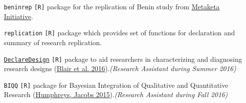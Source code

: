 
\begin{cvskills}

\cvskill
    {\texttt{beninrep}} %
    {\texttt{[R]} package for the replication of Benin study from \href{http://egap.org/metaketa}{Metaketa Initiative}.} %

\cvskill
    {\texttt{replication}} %
    {\texttt{[R]} package which provides set of functions for declaration and summary of research replication.} %

\cvskill
    {\href{https://declaredesign.org/}{\texttt{DeclareDesign}}} %
    {\texttt{[R]} package to aid researchers in characterizing and diagnosing research designs (\href{https://declaredesign.org/paper.pdf}{Blair et al. 2016}).\newline\emph{(Research Assistant during Summer 2016)}} %

\cvskill
    {\texttt{BIQQ}} %
    {\texttt{[R]} package for Bayesian Integration of Qualitative and Quantitative Research (\href{https://www.cambridge.org/core/journals/american-political-science-review/article/mixing-methods-a-bayesian-approach/BB1DFC2FDA3D7F2224F3341042FEA5F4}{Humphreys, Jacobs 2015}).\newline\emph{(Research Assistant during Fall 2016)}} %


\end{cvskills}